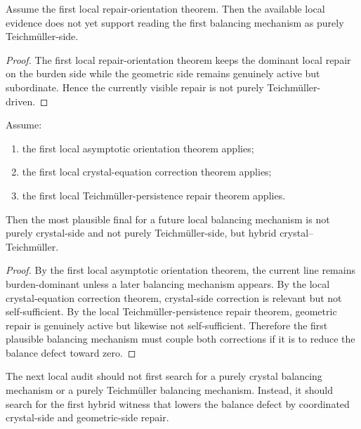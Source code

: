 \begin{proposition}
\label{prop:current-line-does-not-yet-support-purely-teichmueller-balancing}
Assume the first local repair-orientation theorem. Then the available local evidence does not yet support reading the first balancing mechanism as purely Teichm\"uller-side.
\end{proposition}

\begin{proof}
The first local repair-orientation theorem keeps the dominant local repair on the burden side while the geometric side remains genuinely active but subordinate. Hence the currently visible repair is not purely Teichm\"uller-driven.
\end{proof}

\begin{theorem}
\label{thm:first-local-balancing-mechanism-orientation-theorem}
Assume:
\begin{enumerate}[leftmargin=2em,label=(\alph*)]
 \item the first local asymptotic orientation theorem applies;
 \item the first local crystal-equation correction theorem applies;
 \item the first local Teichm\"uller-persistence repair theorem applies.
\end{enumerate}
Then the most plausible final for a future local balancing mechanism is not purely crystal-side and not purely Teichm\"uller-side, but hybrid crystal--Teichm\"uller.
\end{theorem}

\begin{proof}
By the first local asymptotic orientation theorem, the current line remains burden-dominant unless a later balancing mechanism appears. By the local crystal-equation correction theorem, crystal-side correction is relevant but not self-sufficient. By the local Teichm\"uller-persistence repair theorem, geometric repair is genuinely active but likewise not self-sufficient. Therefore the first plausible balancing mechanism must couple both corrections if it is to reduce the balance defect toward zero.
\end{proof}

\begin{corollary}
\label{cor:current-balancing-mechanism-working-rule}
The next local audit should not first search for a purely crystal balancing mechanism or a purely Teichm\"uller balancing mechanism. Instead, it should search for the first hybrid witness that lowers the balance defect by coordinated crystal-side and geometric-side repair.
\end{corollary}

